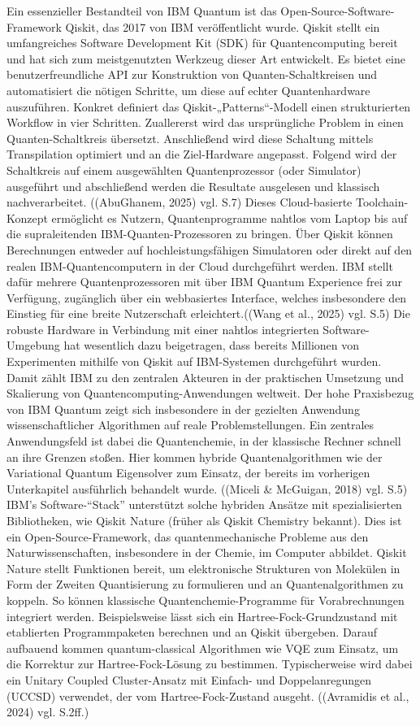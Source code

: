 Ein essenzieller Bestandteil von IBM Quantum ist das Open-Source-Software-Framework Qiskit, das 2017 von IBM veröffentlicht wurde. Qiskit stellt ein umfangreiches Software Development Kit (SDK) für Quantencomputing bereit und hat sich zum meistgenutzten Werkzeug dieser Art entwickelt. Es bietet eine benutzerfreundliche API zur Konstruktion von Quanten-Schaltkreisen und automatisiert die nötigen Schritte, um diese auf echter Quantenhardware auszuführen. Konkret definiert das Qiskit-„Patterns“-Modell einen strukturierten Workflow in vier Schritten. Zuallererst wird das ursprüngliche Problem in einen Quanten-Schaltkreis übersetzt. Anschließend wird diese Schaltung mittels Transpilation optimiert und an die Ziel-Hardware angepasst. Folgend wird der Schaltkreis auf einem ausgewählten Quantenprozessor (oder Simulator) ausgeführt und abschließend werden die Resultate ausgelesen und klassisch nachverarbeitet. ((AbuGhanem, 2025) vgl. S.7)  Dieses Cloud-basierte Toolchain-Konzept ermöglicht es Nutzern, Quantenprogramme nahtlos vom Laptop bis auf die supraleitenden IBM-Quanten-Prozessoren zu bringen. Über Qiskit können Berechnungen entweder auf hochleistungsfähigen Simulatoren oder direkt auf den realen IBM-Quantencomputern in der Cloud durchgeführt werden. IBM stellt dafür mehrere Quantenprozessoren mit über IBM Quantum Experience frei zur Verfügung, zugänglich über ein webbasiertes Interface, welches insbesondere den Einstieg für eine breite Nutzerschaft erleichtert.((Wang et al., 2025) vgl. S.5) Die robuste Hardware in Verbindung mit einer nahtlos integrierten Software-Umgebung hat wesentlich dazu beigetragen, dass bereits Millionen von Experimenten mithilfe von Qiskit auf IBM-Systemen durchgeführt wurden. Damit zählt IBM zu den zentralen Akteuren in der praktischen Umsetzung und Skalierung von Quantencomputing-Anwendungen weltweit.
Der hohe Praxisbezug von IBM Quantum zeigt sich insbesondere in der gezielten Anwendung wissenschaftlicher Algorithmen auf reale Problemstellungen. Ein zentrales Anwendungsfeld ist dabei die Quantenchemie, in der klassische Rechner schnell an ihre Grenzen stoßen. Hier kommen hybride Quantenalgorithmen wie der Variational Quantum Eigensolver zum Einsatz, der bereits im vorherigen Unterkapitel ausführlich behandelt wurde. ((Miceli & McGuigan, 2018) vgl. S.5) IBM’s Software-“Stack” unterstützt solche hybriden Ansätze mit spezialisierten Bibliotheken, wie Qiskit Nature (früher als Qiskit Chemistry bekannt). Dies ist ein Open-Source-Framework, das quantenmechanische Probleme aus den Naturwissenschaften, insbesondere in der Chemie, im Computer abbildet. Qiskit Nature stellt Funktionen bereit, um elektronische Strukturen von Molekülen in Form der Zweiten Quantisierung zu formulieren und an Quantenalgorithmen zu koppeln. So können klassische Quantenchemie-Programme für Vorabrechnungen integriert werden. Beispielsweise lässt sich ein Hartree-Fock-Grundzustand mit etablierten Programmpaketen berechnen und an Qiskit übergeben. Darauf aufbauend kommen quantum-classical Algorithmen wie VQE zum Einsatz, um die Korrektur zur Hartree-Fock-Lösung zu bestimmen. Typischerweise wird dabei ein Unitary Coupled Cluster-Ansatz mit Einfach- und Doppelanregungen (UCCSD) verwendet, der vom Hartree-Fock-Zustand ausgeht. ((Avramidis et al., 2024) vgl. S.2ff.)
